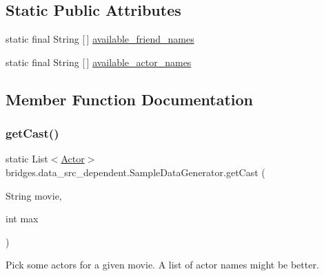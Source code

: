 \subsection*{Static Public Attributes}
\begin{DoxyCompactItemize}
\item 
static final String \mbox{[}$\,$\mbox{]} \hyperlink{classbridges_1_1data__src__dependent_1_1_sample_data_generator_a304c946018534a5a2b0049aace9d4472}{available\+\_\+friend\+\_\+names}
\item 
static final String \mbox{[}$\,$\mbox{]} \hyperlink{classbridges_1_1data__src__dependent_1_1_sample_data_generator_aac86cadaeb8859e94b6ed47a066cbbfc}{available\+\_\+actor\+\_\+names}
\end{DoxyCompactItemize}


\subsection{Member Function Documentation}
\hypertarget{classbridges_1_1data__src__dependent_1_1_sample_data_generator_a2e5c2ea6214a140a50b375f4e859ed0d}{}\label{classbridges_1_1data__src__dependent_1_1_sample_data_generator_a2e5c2ea6214a140a50b375f4e859ed0d} 
\subsubsection{\texorpdfstring{get\+Cast()}{getCast()}}
{\footnotesize\ttfamily static List$<$\hyperlink{classbridges_1_1data__src__dependent_1_1_actor}{Actor}$>$ bridges.\+data\+\_\+src\+\_\+dependent.\+Sample\+Data\+Generator.\+get\+Cast (\begin{DoxyParamCaption}\item[{String}]{movie,  }\item[{int}]{max }\end{DoxyParamCaption})\hspace{0.3cm}{\ttfamily [static]}}

Pick some actors for a given movie. A list of actor names might be better.


